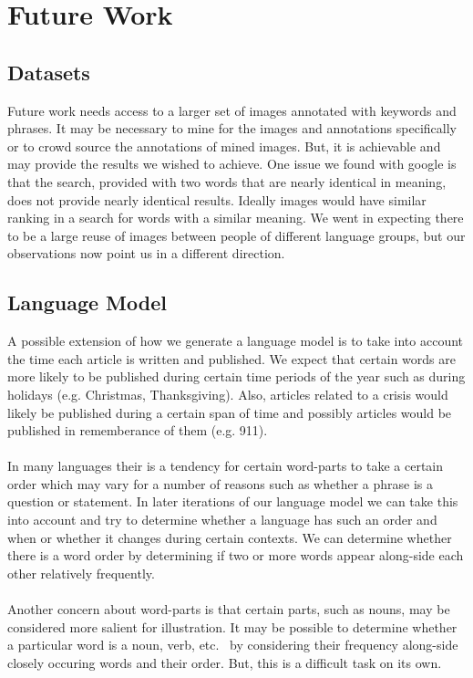 \documentclass[12pt]{article}
\begin{document}
\section{Future Work}
\subsection{Datasets}
Future work needs access to a larger set of images annotated with keywords and phrases. It may be necessary to mine 
for the images and annotations specifically or to crowd source the annotations of mined images. But, it is achievable 
and may provide the results we wished to achieve. One issue we found with google is that the search, provided with two 
words that are nearly identical in meaning, does not provide nearly identical results. Ideally images would have 
similar ranking in a search for words with a similar meaning. We went in expecting there to be a large reuse of images 
between people of different language groups, but our observations now point us in a different direction.

\subsection{Language Model}
A possible extension of how we generate a language model is to take into account the time each article is written and 
published. We expect that certain words are more likely to be published during certain time periods of the year such as 
during holidays (e.g. Christmas, Thanksgiving). Also, articles related to a crisis would likely be published during a 
certain span of time and possibly articles would be published in rememberance of them (e.g. 911).
\paragraph{}
In many languages their is a tendency for certain word-parts to take a certain order which may vary for a number of 
reasons such as whether a phrase is a question or statement. In later iterations of our language model we can take 
this into account and try to determine whether a language has such an order and when or whether it changes during 
certain contexts. We can determine whether there is a word order by determining if two or more words appear 
along-side each other relatively frequently.
\paragraph{}
Another concern about word-parts is that certain parts, such as nouns, may be considered more salient for illustration. 
It may be possible to determine whether a particular word is a noun, verb, etc. \ by considering their frequency 
along-side closely occuring words and their order. But, this is a difficult task on its own.
\end{document}
